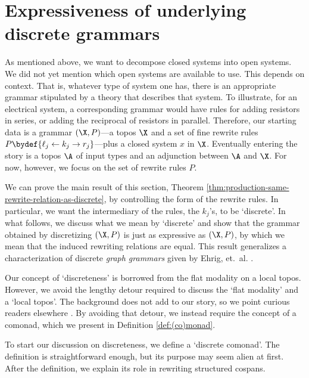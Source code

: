 \section{Expressiveness of underlying discrete grammars}
\label{sec:gen-result-graph-rewriting}

As mentioned above, we want to decompose closed systems into
open systems.  We did not yet mention which open systems are
available to use. This depends on context.  That is,
whatever type of system one has, there is an appropriate
grammar stipulated by a theory that describes that
system. To illustrate, for an electrical system, a
corresponding grammar would have rules for adding resistors
in series, or adding the reciprocal of resistors in
parallel. Therefore, our starting data is a grammar
$ ( \X , P ) $---a topos $ \X $ and a set of fine rewrite
rules $ P \bydef \{ \ell_j \gets k_j \to r_j \} $---plus a
closed system $ x $ in $ \X $.  Eventually entering the
story is a topos $ \A $ of input types and an adjunction
between $ \A $ and $ \X $.  For now, however, we focus on the
set of rewrite rules $ P $.

We can prove the main result of this section, Theorem
\ref{thm:production-same-rewrite-relation-as-discrete}, by
controlling the form of the rewrite rules.  In particular,
we want the intermediary of the rules, the $ k_j $'s, to be
`discrete'. In what follows, we discuss what we mean by
`discrete' and show that the grammar obtained by
discretizing $ ( \X,P ) $ is just as expressive as
$ ( \X,P ) $, by which we mean that the induced rewriting
relations are equal. This result generalizes a
characterization of discrete \emph{graph grammars} given by
Ehrig, et.~al. \cite[Prop.~3.3]{ehrig_graph-grammars}.

Our concept of `discreteness' is borrowed from the flat
modality on a local topos. However, we avoid the lengthy
detour required to discuss the `flat modality' and a `local
topos'. The background does not add to our story, so we
point curious readers elsewhere
\cite[Ch.~C3.6]{johnstone_elephant}. By avoiding that
detour, we instead require the concept of a comonad, which
we present in Definition \ref{def:(co)monad}.

To start our discussion on discreteness, we define a
`discrete comonad'. The definition is straightforward enough,
but its purpose may seem alien at first. After the
definition, we explain its role in rewriting structured
cospans.

